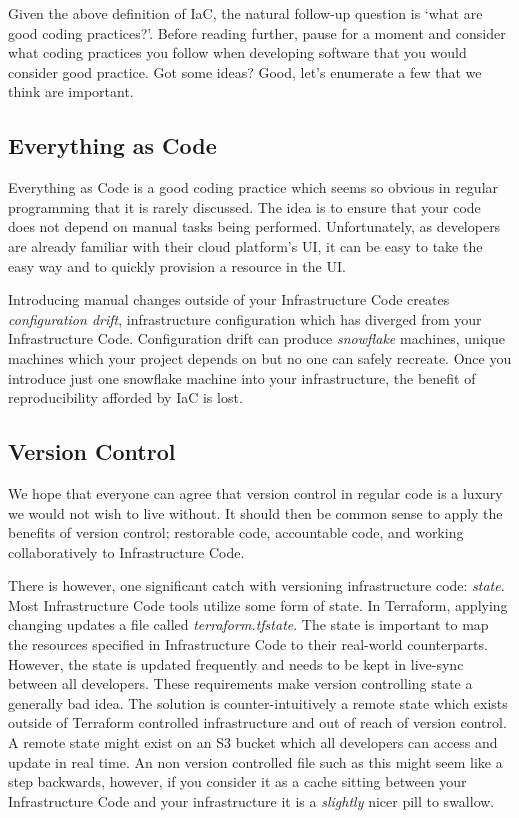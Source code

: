 Given the above definition of IaC,
the natural follow-up question is 
`what are good coding practices?'.
Before reading further,
pause for a moment and consider what coding practices you follow when developing software that you would consider good practice.
Got some ideas? Good, let's enumerate a few that we think are important.

\subsection{Everything as Code}
Everything as Code is a good coding practice which seems so obvious in regular programming that it is rarely discussed.
The idea is to ensure that your code does not depend on manual tasks being performed.
Unfortunately, as developers are already familiar with their cloud platform's UI,
it can be easy to take the easy way and to quickly provision a resource in the UI.

Introducing manual changes outside of your Infrastructure Code creates \textsl{configuration drift}, infrastructure configuration which has diverged from your Infrastructure Code.
Configuration drift can produce \textsl{snowflake} machines,
unique machines which your project depends on but no one can safely recreate.
Once you introduce just one snowflake machine into your infrastructure,
the benefit of reproducibility afforded by IaC is lost.

\subsection{Version Control}
We hope that everyone can agree that version control in regular code is a luxury we would not wish to live without.
It should then be common sense to apply the benefits of version control;
restorable code, accountable code, and working collaboratively to Infrastructure Code.

There is however, one significant catch with versioning infrastructure code: \textsl{state}.
Most Infrastructure Code tools utilize some form of state.
In Terraform, applying changing updates a file called \textsl{terraform.tfstate}.
The state is important to map the resources specified in Infrastructure Code to their real-world counterparts.
However, the state is updated frequently and needs to be kept in live-sync between all developers.
These requirements make version controlling state a generally bad idea.
The solution is counter-intuitively a remote state which exists outside of Terraform controlled infrastructure and out of reach of version control.
A remote state might exist on an S3 bucket which all developers can access and update in real time.
An non version controlled file such as this might seem like a step backwards,
however, if you consider it as a cache sitting between your Infrastructure Code and your infrastructure it is a \textsl{slightly} nicer pill to swallow.

